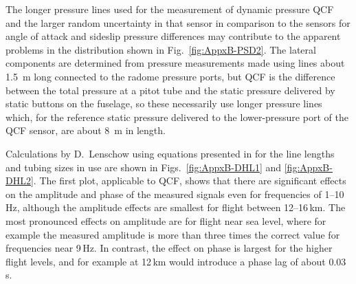 \documentclass[12pt,twoside,english]{article}\usepackage[]{graphicx}\usepackage[]{color}
\let\OrgIndex\index
\renewcommand*{\index}[1]{\OrgIndex{#1}}
\begin{document}
The longer pressure lines used for the measurement of dynamic pressure QCF and the larger random uncertainty in that sensor in comparison to the sensors for angle of attack and sideslip pressure differences may contribute to the apparent problems in the distribution shown in Fig.~\ref{fig:AppxB-PSD2}. The lateral components are determined from pressure measurements made using lines about 1.5~m long connected to the radome pressure ports, but QCF is the difference between the total pressure at a pitot tube and the static pressure delivered by static buttons on the fuselage, so these necessarily use longer pressure lines which, for the reference static pressure delivered to the lower-pressure port of the QCF sensor, are about 8~m in length.

Calculations by D.~Lenschow using equations presented in \citet{Iberall1950} for the line lengths and tubing sizes in use are shown in Figs.~\ref{fig:AppxB-DHL1} and \ref{fig:AppxB-DHL2}. The first plot, applicable to QCF, shows that there are significant effects on the amplitude and phase of the measured signals even for frequencies of 1--10\,Hz, although the amplitude effects are smallest for flight between 12--16\,km. The most pronounced effects on amplitude are for flight near sea level, where for example the measured amplitude is more than three times the correct value for frequencies near 9\,Hz. In contrast, the effect on phase is largest for the higher flight levels, and for example at 12\,km would introduce a phase lag of about 0.03\,s. 
\end{document}
